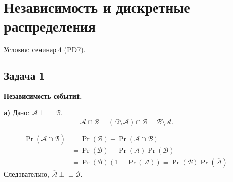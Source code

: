 \section{Независимость и дискретные распределения}

\noindent Условия:
\href{run:conditions/sem_04.pdf}{семинар 4 (PDF)}.

\subsection{Задача 1}

\begin{solution}
    \textbf{Независимость событий.}

    \textbf{а)} Дано: $\mathcal{A}\perp\!\!\!\perp\mathcal{B}$.
    \[
        \overline{\mathcal{A}}\cap\mathcal{B}
        =(\Omega\setminus\mathcal{A})\cap\mathcal{B}
        =\mathcal{B}\setminus\mathcal{A}.
    \]
    \begin{center}
    \end{center}
    \[
        \begin{aligned}
            \Pr(\overline{\mathcal{A}}\cap\mathcal{B})
            &=\Pr(\mathcal{B})-\Pr(\mathcal{A}\cap\mathcal{B})\\
            &=\Pr(\mathcal{B})-\Pr(\mathcal{A})\Pr(\mathcal{B})\\
            &=\Pr(\mathcal{B})(1-\Pr(\mathcal{A}))
             =\Pr(\mathcal{B})\Pr(\overline{\mathcal{A}}).
        \end{aligned}
    \]
    Следовательно, $\overline{\mathcal{A}}\perp\!\!\!\perp\mathcal{B}$.


\end{solution}
